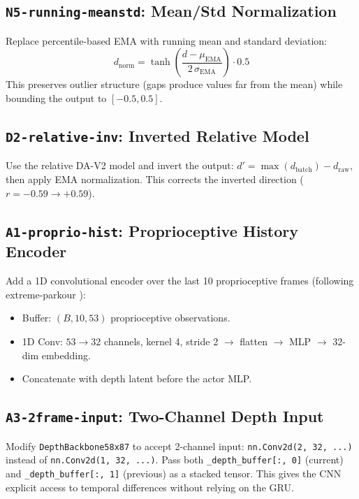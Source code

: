 \documentclass[11pt,a4paper]{article}
\begin{document}
\subsection{\texttt{N5-running-meanstd}: Mean/Std Normalization}

Replace percentile-based EMA with running mean and standard deviation:
\[
  d_{\text{norm}} = \tanh\!\left(\frac{d - \mu_{\text{EMA}}}
  {2\,\sigma_{\text{EMA}}}\right) \cdot 0.5
\]
This preserves outlier structure (gaps produce values far from the mean)
while bounding the output to $[-0.5, 0.5]$.

\subsection{\texttt{D2-relative-inv}: Inverted Relative Model}

Use the relative DA-V2 model and invert the output:
$d' = \max(d_{\text{batch}}) - d_{\text{raw}}$, then apply EMA
normalization.  This corrects the inverted direction ($r = -0.59 \to
+0.59$).

\subsection{\texttt{A1-proprio-hist}: Proprioceptive History Encoder}

Add a 1D convolutional encoder over the last 10 proprioceptive frames
(following extreme-parkour \cite{cheng2023extreme}):
\begin{itemize}[nosep]
  \item Buffer: $(B, 10, 53)$ proprioceptive observations.
  \item 1D Conv: $53 \to 32$ channels, kernel 4, stride 2 $\to$ flatten
        $\to$ MLP $\to$ 32-dim embedding.
  \item Concatenate with depth latent before the actor MLP.
\end{itemize}

\subsection{\texttt{A3-2frame-input}: Two-Channel Depth Input}

Modify \texttt{DepthBackbone58x87} to accept 2-channel input:
\texttt{nn.Conv2d(2, 32, ...)} instead of \texttt{nn.Conv2d(1, 32, ...)}.
Pass both \texttt{\_depth\_buffer[:, 0]} (current) and
\texttt{\_depth\_buffer[:, 1]} (previous) as a stacked tensor.
This gives the CNN explicit access to temporal differences without
relying on the GRU.
\end{document}
